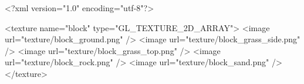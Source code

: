 <?xml version="1.0" encoding="utf-8"?>

<texture name="block" type="GL_TEXTURE_2D_ARRAY">
  <image url="texture/block_ground.png" />
  <image url="texture/block_grass_side.png" />
  <image url="texture/block_grass_top.png" />
  <image url="texture/block_rock.png" />
  <image url="texture/block_sand.png" />
</texture>
